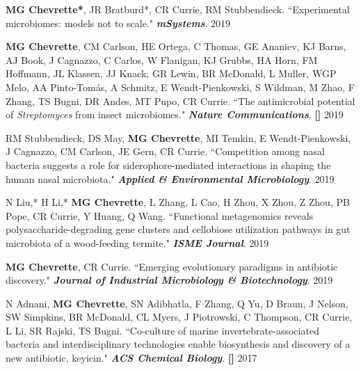 \begin{cvpubs}
\cvpub
{\textbf{MG Chevrette*}, JR Bratburd*, CR Currie, RM Stubbendieck. ``Experimental microbiomes: models not to scale." \textit{\textbf{mSystems}}. \textbf{\textit{}}}
{2019}

\cvpub
{\textbf{MG Chevrette}, CM Carlson, HE Ortega, C Thomas, GE Ananiev, KJ Barns, AJ Book, J Cagnazzo, C Carlos, W Flanigan, KJ Grubbs, HA Horn, FM Hoffmann, JL Klassen, JJ Knack, GR Lewin, BR McDonald, L Muller, WGP Melo, AA Pinto-Tom\'{a}s, A Schmitz, E Wendt-Pienkowski, S Wildman, M Zhao, F Zhang, TS Bugni, DR Andes, MT Pupo, CR Currie. ``The antimicrobial potential of \textit{Streptomyces} from insect microbiomes." \textit{\textbf{Nature Communications}}. \textbf{\textit{}} \linebreak \textbf{[\textit{}]}}
{2019}

\cvpub
{RM Stubbendieck, DS May, \textbf{MG Chevrette}, MI Temkin, E Wendt-Pienkowski, J Cagnazzo, CM Carlson, JE Gern, CR Currie. ``Competition among nasal bacteria suggests a role for siderophore-mediated interactions in shaping the human nasal microbiota." \textit{\textbf{Applied \& Environmental Microbiology}}. \textbf{\textit{}}}
{2019}

\cvpub
{N Liu,* H Li,* \textbf{MG Chevrette}, L Zhang, L Cao, H Zhou, X Zhou, Z Zhou, PB Pope, CR Currie, Y Huang, Q Wang. ``Functional metagenomics reveals polysaccharide-degrading gene clusters and cellobiose utilization pathways in gut microbiota of a wood-feeding termite." \textit{\textbf{ISME Journal}}. \textbf{\textit{}}}
{2019}

\cvpub
{\textbf{MG Chevrette}, CR Currie. ``Emerging evolutionary paradigms in antibiotic discovery." \textit{\textbf{Journal of Industrial Microbiology \& Biotechnology}}. \textbf{\textit{}}}
{2019}

\cvpub
{N Adnani, \textbf{MG Chevrette}, SN Adibhatla, F Zhang, Q Yu, D Braun, J Nelson, SW Simpkins, BR McDonald, CL Myers, J Piotrowski, C Thompson, CR Currie, L Li, SR Rajski, TS Bugni. ``Co-culture of marine invertebrate-associated bacteria and interdisciplinary technologies enable biosynthesis and discovery of a new antibiotic, keyicin." \textit{\textbf{ACS Chemical Biology}}.  \textbf{\textit{}} \linebreak \textbf{[\textit{}]}}
{2017}


\end{cvpubs}
